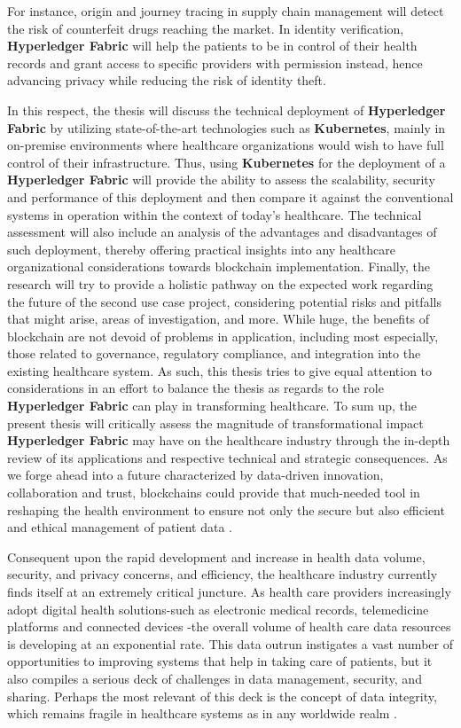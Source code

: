 For instance, origin and journey tracing in supply chain management will detect the risk of counterfeit drugs 
reaching the market. In identity verification, \textbf{Hyperledger Fabric} will help the patients to be in 
control of their health records and grant access to specific providers with permission instead, hence advancing 
privacy while reducing the risk of identity theft.

In this respect, the thesis will discuss the technical deployment of 
\textbf{Hyperledger Fabric} by utilizing state-of-the-art technologies such as 
\textbf{Kubernetes}, mainly in on-premise environments where healthcare 
organizations would wish to have full control of their infrastructure. 
Thus, using \textbf{Kubernetes} for the deployment of a \textbf{Hyperledger Fabric} will provide 
the ability to assess the scalability, security and performance of this deployment and then compare 
it against the conventional systems in operation within the context of today's healthcare. 
The technical assessment will also include an analysis of the advantages and disadvantages of such deployment,
thereby offering practical insights into any healthcare organizational considerations towards blockchain 
implementation. Finally, the research will try to provide a holistic pathway on the expected work regarding
the future of the second use case project, considering potential risks and pitfalls that might arise, areas of 
investigation, and more. While huge, the benefits of blockchain are not devoid of problems in application, 
including most especially, those related to governance, regulatory compliance, and integration into the existing 
healthcare system. As such, this thesis tries to give equal attention to considerations in an effort to 
balance the thesis as regards to the role \textbf{Hyperledger Fabric} can play in transforming healthcare. 
To sum up, the present thesis will critically assess the magnitude of transformational impact \textbf{Hyperledger Fabric} 
may have on the healthcare industry through the in-depth review of its applications and respective technical 
and strategic consequences. As we forge ahead into a future characterized by data-driven innovation, 
collaboration and trust, blockchains could provide that much-needed tool in reshaping the health environment 
to ensure not only the secure but also efficient and ethical management of patient data \cite{kubernetes}.

Consequent upon the rapid development and increase in health data volume, security, and privacy concerns,
and efficiency, the healthcare industry currently finds itself at an extremely critical juncture. As health care 
providers increasingly adopt digital health solutions-such as electronic medical records, telemedicine platforms 
and connected devices -the overall volume of health care data resources is developing at an exponential rate. This
data outrun instigates a vast number of  opportunities to improving systems that help in taking care of patients, 
but it also compiles a serious deck of challenges in data management, security, and sharing. Perhaps the most 
relevant of this deck is the concept of data integrity, which remains fragile in healthcare systems as in any
worldwide realm \cite{data-volume-increase-healthcare}.

